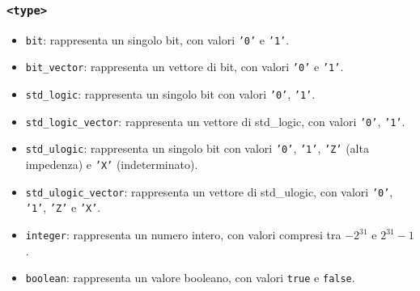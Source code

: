         \subsubsection{\texttt{<type>}}
               \begin{itemize}
                \item \texttt{bit}: rappresenta un singolo bit, con valori \texttt{'0'} e \texttt{'1'}.
                \item \texttt{bit\_vector}: rappresenta un vettore di bit, con valori \texttt{'0'} e \texttt{'1'}.
                \item \texttt{std\_logic}: rappresenta un singolo bit con valori \texttt{'0'}, \texttt{'1'}.
                \item \texttt{std\_logic\_vector}: rappresenta un vettore di std\_logic, con valori \texttt{'0'}, \texttt{'1'}.
                \item \texttt{std\_ulogic}: rappresenta un singolo bit con valori \texttt{'0'}, \texttt{'1'}, \texttt{'Z'} (alta impedenza) e \texttt{'X'} (indeterminato).
                \item \texttt{std\_ulogic\_vector}: rappresenta un vettore di std\_ulogic, con valori \texttt{'0'}, \texttt{'1'}, \texttt{'Z'} e \texttt{'X'}.
                \item \texttt{integer}: rappresenta un numero intero, con valori compresi tra $-2^{31}$ e $2^{31}-1$.
                \item \texttt{boolean}: rappresenta un valore booleano, con valori \texttt{true} e \texttt{false}.
               \end{itemize} 